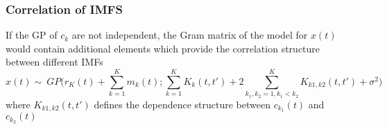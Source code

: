 \subsubsection{Correlation of IMFS }
If the GP of $c_k$ are not independent, the Gram matrix of the model for $x(t)$ would contain additional elements which provide the correlation structure between different IMFs
\begin{equation}
x(t) \sim ~   GP \bigg(r_K(t) + \sum_{k=1}^K m_k(t); \sum_{k=1}^K K_k(t,t') + 2\sum_{k_1,k_2=1, k_1<k_2}^K K_{k1,k2}(t,t') + \sigma^2 \bigg) 
\end{equation}
where $K_{k1,k2}(t,t')$ defines the dependence structure between $c_{k_1}(t)$ and $c_{k_2}(t)$
